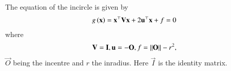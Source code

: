 The equation of the incircle is given by 
		\begin{align}
			 \label{eq:conic_quad_form}
	  {g}\brak{\vec{x}}=
			\vec{x}^{\top}\vec{V}\vec{x}+2\vec{u}^{\top}\vec{x}+f = 0
		\end{align}
		where 
		\begin{align}
			\mathbf{V}=\mathbf{I}, \mathbf{u}=-\mathbf{O}, f = \left\lVert\mathbf{O}\right\rVert-r^2,
		\end{align}
		$\vec{O}$ being the incentre and $r$ the inradius.  Here $\vec{I}$ is the identity matrix.
